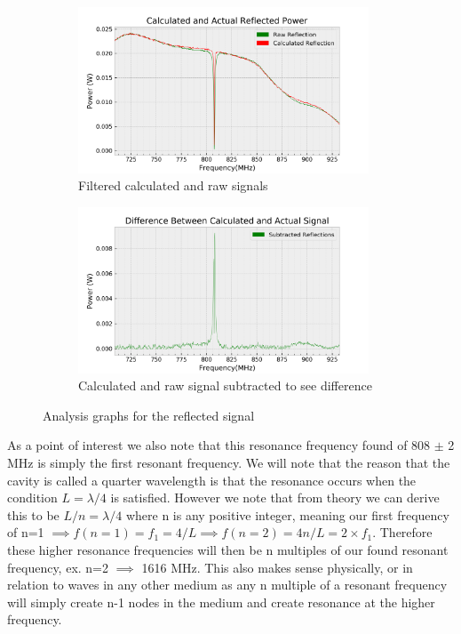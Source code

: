 \begin{figure}[h!]
\centering
\begin{subfigure}[t]{.475\textwidth}
  \centering
  \includegraphics[width=0.95\textwidth]{figures/PartB/reflect_savgol.png}
  \caption{Filtered calculated and raw signals}
 \label{fig:raw_reflect_filt}
\end{subfigure}\hfill
\begin{subfigure}[t]{.475\textwidth}
  \centering
  \includegraphics[width=0.95\textwidth]{figures/PartB/reflect_sub.png}
  \caption{Calculated and raw signal subtracted to see difference}
\label{fig:reflect_sub}
\end{subfigure}
\caption{Analysis graphs for the reflected signal}
\label{fig:analysis_reflect}
\end{figure}

As a point of interest we also note that this resonance frequency found of 808 $\pm$ 2 MHz is simply the first resonant frequency. We will note that the reason that the cavity is called a quarter wavelength is that the resonance occurs when the condition $L = \lambda/4$ is satisfied. However we note that from theory we can derive this to be $L/n = \lambda/4$ where n is any positive integer, meaning our first frequency of n=1 $\implies f(n=1)= f_1 = 4/L \implies f(n=2) = 4n/L = 2 \times f_1$. Therefore these higher resonance frequencies will then be n multiples of our found resonant frequency, ex. n=2 $\implies$ 1616 MHz. This also makes sense physically, or in relation to waves in any other medium as any n multiple of a resonant frequency will simply create n-1 nodes in the medium and create resonance at the higher frequency.

